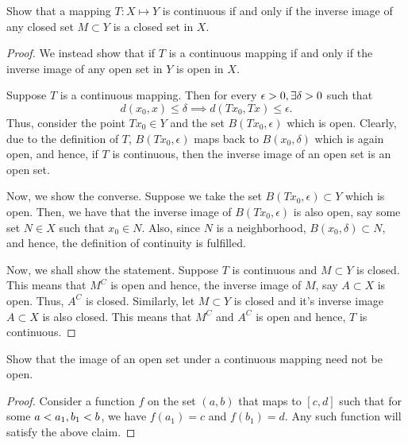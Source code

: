 \begin{question}
    Show that a mapping $T : X \mapsto Y$ is continuous if and only if the inverse image of any closed set $M \subset Y$ is a closed set in $X$.
    \label{section1.3-14}
\end{question}
\begin{proof}
    We instead show that if $T$ is a continuous mapping if and only if the inverse image of any open set in $Y$ is open in $X$.

    Suppose $T$ is a continuous mapping. Then for every $\epsilon > 0, \exists \delta > 0$ such that 
    \[d(x_0,x) \leq \delta \implies d(Tx_0 , Tx) \leq \epsilon.\]
    Thus, consider the point $Tx_0 \in Y$ and the set $B(Tx_0 , \epsilon)$ which is open. Clearly, due to the definition of $T$, $B(Tx_0,\epsilon)$ maps back to $B(x_0 , \delta)$ which is again open, and hence, if $T$ is continuous, then the inverse image of an open set is an open set.

    Now, we show the converse. Suppose we take the set $B(Tx_0 , \epsilon) \subset Y$ which is open. Then, we have that the inverse image of $B(Tx_0 , \epsilon)$ is also open, say some set $N \in X$ such that $x_0 \in N$. Also, since $N$ is a neighborhood, $B(x_0 , \delta) \subset N$, and hence, the definition of continuity is fulfilled.

    Now, we shall show the statement. Suppose $T$ is continuous and $M \subset Y$ is closed. This means that $M^C$ is open and hence, the inverse image of $M$, say $A \subset X$ is open. Thus, $A^C$ is closed. Similarly, let $M \subset Y$ is closed and it's inverse image $A \subset X$ is also closed. This means that $M^C$ and $A^C$ is open and hence, $T$ is continuous.
\end{proof}

\begin{question}
Show that the image of an open set under a continuous mapping need not be open.
\label{section1.3-15}
\end{question}
\begin{proof}
    Consider a function $f$ on the set $(a,b)$ that maps to $[c,d]$ such that for some $a < a_1,b_1 < b$, we have $f(a_1) = c$ and $f(b_1) = d$. Any such function  will satisfy the above claim.
\end{proof}
